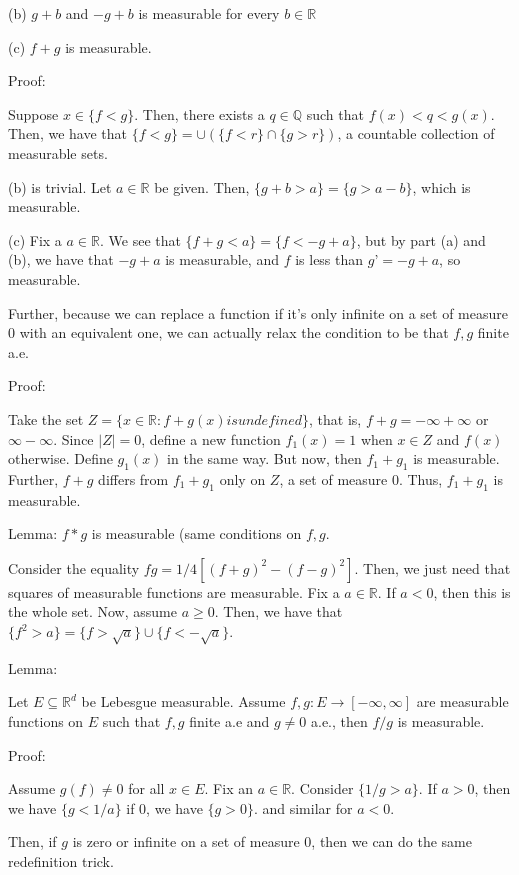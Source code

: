\documentclass[10pt]{article}
\begin{document}
(b) $g+b$ and $-g + b$ is measurable for every $b \in \mathbb{R}$

(c) $f + g$ is measurable.

Proof:

Suppose $ x \in \{ f < g \}$. Then, there exists a $q \in \mathbb{Q}$ such that $f(x) < q < g(x)$. Then, we have that $\{ f < g \} = \cup ( \{ f < r \} \cap \{ g > r \})$, a countable collection of measurable sets.

(b) is trivial. Let $ a \in \mathbb{R}$ be given. Then, $\{ g + b > a \} = \{ g > a - b \}$, which is measurable.

(c) Fix a $a \in \mathbb{R}$. We see that $ \{ f + g < a\} = \{ f < -g +a \}$, but by part (a) and (b), we have that $-g + a$ is measurable, and $f$ is less than $g’ = -g +a$, so measurable.

Further, because we can replace a function if it’s only infinite on a set of measure 0 with an equivalent one, we can actually relax the condition to be that $f,g$ finite a.e.

Proof:

Take the set $Z = \{ x \in \mathbb{R} : f+g(x) is undefined \}$, that is, $f+g = -\infty + \infty$ or $\infty - \infty$. Since $|Z| = 0$, define a new function $f_1(x) = 1$ when $x \in Z$ and $f(x)$ otherwise. Define $g_1(x)$ in the same way. But now, then $f_1 + g_1$ is measurable. Further, $f+g$ differs from $f_1 + g_1$ only on $Z$, a set of measure 0. Thus, $f_1 + g_1$ is measurable.

Lemma: $f*g$ is measurable (same conditions on $f,g$.

Consider the equality $fg = 1/4 [(f+g)^2 - (f-g)^2 ]$. Then, we just need that squares of measurable functions are measurable. Fix a $a \in \mathbb{R}$. If $a < 0$, then this is the whole set. Now, assume $a \geq 0$. Then, we have that $\{ f^2 > a \} = \{ f >  \sqrt{a} \} \cup \{ f <  -\sqrt{a} \}$.

Lemma: 

Let $E \subseteq \mathbb{R}^d$ be Lebesgue measurable. Assume $f,g: E \to [-\infty,\infty]$ are measurable functions on $E$ such that $f,g$ finite a.e and $g \not = 0$ a.e., then $f/g$ is measurable.

Proof:

Assume $g(f) \not = 0$ for all $x \in E$. Fix an $a \in \mathbb{R}$. Consider $\{ 1/g > a \}$. If $a > 0$, then we have $ \{ g < 1/a \}$ if 0, we have $ \{ g > 0 \}$. and similar for $a < 0$.

Then, if $g$ is zero or infinite on a set of measure 0, then we can do the same redefinition trick.
\end{document}
